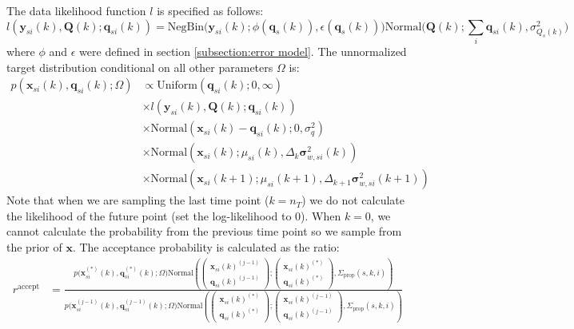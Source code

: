 \documentclass{article}
\newcommand{\Normaldist}{\text{Normal}}
\newcommand{\x}[2]{\mathbf{x}_{#2}(#1)}
\newcommand{\xexp}[3]{\mathbf{x}^{#3}_{#2}(#1)}
\newcommand{\q}[2]{\mathbf{q}_{#2}(#1)}
\newcommand{\qexp}[3]{\mathbf{q}^{#3}_{#2}(#1)}
\newcommand{\Q}{\mathbf{Q}}
\newcommand{\y}[2]{\mathbf{y}_{#2}(#1)}
\newcommand{\varQ}[1]{\sigma^2_{Q_s(#1)}}
\newcommand{\varw}[1]{\mathbf{\sigma}^2_{w,{}#1}}
\newcommand{\dt}{\Delta_{k}}
\begin{document}
The data likelihood function $l$ is specified as follows:
\begin{equation}
	l(\y{k}{si}, \Q(k) ; \q{k}{si}) =
		\text{NegBin} \Big( \y{k}{si}; \phi(\q{k}{s}), \epsilon(\q{k}{s}) \Big)
		\text{Normal}\Big( \Q(k); \sum_i \q{k}{si}, \varQ{k} \Big)
\end{equation}
where $\phi$ and $\epsilon$ were defined in section \ref{subsection:error model}. The unnormalized target distribution conditional on all other parameters $\Omega$ is:
\begin{align}
\label{eqn:likelihood_aux_traj}
	p(\x{k}{si}, \q{k}{si} ; \Omega) & \propto \text{Uniform}(\q{k}{si}; 0, \infty) \\
		& \times l(\y{k}{si}, \Q(k) ; \q{k}{si}) \nonumber \\
		& \times \text{Normal}(\x{k}{si} - \q{k}{si}; 0, \sigma^2_{q}) \nonumber \\
		& \times \text{Normal}(\x{k}{si}; \mu_{si}(k), \dt \varw{si}(k)) \nonumber \\
		& \times \text{Normal}(\x{k+1}{si}; \mu_{si}(k+1), \Delta_{k+1} \varw{si}(k+1)) \nonumber
\end{align}
Note that when we are sampling the last time point ($k=n_T$) we do not calculate the likelihood of the future point (set the log-likelihood to 0). When $k=0$, we cannot calculate the probability from the previous time point so we sample from the prior of $\mathbf{x}$. The acceptance probability is calculated as the ratio:
\begin{align}
	r^{\text{accept}} & = \frac
		{p \Big( \xexp{k}{si}{(*)}, \qexp{k}{si}{(*)}; \Omega \Big)
    \Normaldist \left(
  		\left(
  		\begin{array}{ccc}
  			\x{k}{si}^{(j-1)} \\
  			\q{k}{si}^{(j-1)}
  		\end{array} \right);
      \left( \begin{array}{ccc}
  			\x{k}{si}^{(*)} \\
  			\q{k}{si}^{(*)}
  		\end{array} \right), \Sigma_{\text{prop}}(s,k,i)
  	\right)}
		{p \Big( \xexp{k}{si}{(j-1)}, \qexp{k}{si}{(j-1)}; \Omega \Big)
    \Normaldist \left(
  		\left(
  		\begin{array}{ccc}
  			\x{k}{si}^{(*)} \\
  			\q{k}{si}^{(*)}
  		\end{array} \right);
      \left( \begin{array}{ccc}
  			\x{k}{si}^{(j-1)} \\
  			\q{k}{si}^{(j-1)}
  		\end{array} \right), \Sigma_{\text{prop}}(s,k,i)
  	\right)}
\end{align}
\end{document}

